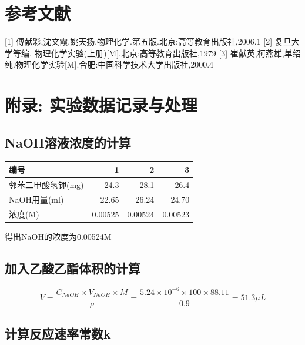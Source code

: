 \documentclass[11pt]{article}
\begin{document}
\section{参考文献}
\label{sec:orgdaea1b7}
[1]  傅献彩,沈文霞,姚天扬.物理化学.第五版.北京:高等教育出版社,2006.1
[2]  复旦大学等编. 物理化学实验(上册)[M].北京:高等教育出版社,1979
[3] 崔献英,柯燕雄,单绍纯.物理化学实验[M].合肥:中国科学技术大学出版社,2000.4

\section{附录: 实验数据记录与处理}
\label{sec:org6a1f341}

\subsection{NaOH溶液浓度的计算}
\label{sec:orge244b9e}
\begin{center}
\begin{tabular}{lrrr}
编号 & 1 & 2 & 3\\
\hline
邻苯二甲酸氢钾(mg) & 24.3 & 28.1 & 26.4\\
NaOH用量(ml) & 22.65 & 26.24 & 24.70\\
浓度(M) & 0.00525 & 0.00524 & 0.00523\\
\end{tabular}
\end{center}

得出NaOH的浓度为0.00524M


\subsection{加入乙酸乙酯体积的计算}
\label{sec:orgfb99348}
\[
V=\frac{C_{NaOH}\times V_{NaOH}\times M}{\rho}=\frac{5.24\times 10^{-6}\times 100 \times 88.11}{0.9}=51.3\mu L
\]



\subsection{计算反应速率常数k}
\label{sec:orgebdb8d2}
\end{document}
